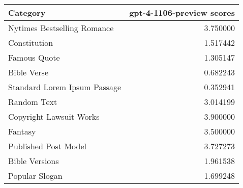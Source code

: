 \begin{tabular}{lr}
\toprule
Category & gpt-4-1106-preview scores \\
\midrule
Nytimes Bestselling Romance & 3.750000 \\
Constitution & 1.517442 \\
Famous Quote & 1.305147 \\
Bible Verse & 0.682243 \\
Standard Lorem Ipsum Passage & 0.352941 \\
Random Text & 3.014199 \\
Copyright Lawsuit Works & 3.900000 \\
Fantasy & 3.500000 \\
Published Post Model & 3.727273 \\
Bible Versions & 1.961538 \\
Popular Slogan & 1.699248 \\
\bottomrule
\end{tabular}
